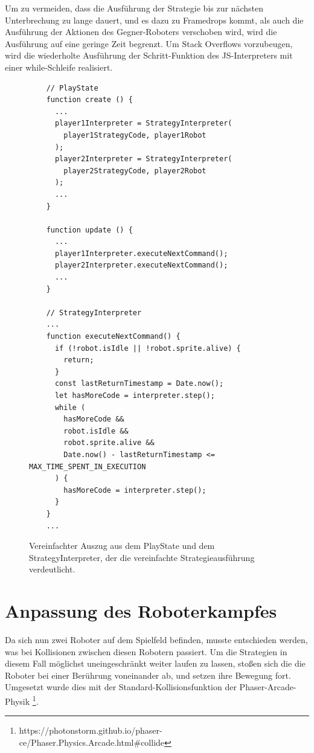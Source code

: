 Um zu vermeiden, dass die Ausführung der Strategie bis zur nächsten Unterbrechung zu lange dauert,
und es dazu zu Framedrops kommt, als auch die Ausführung der Aktionen des Gegner-Roboters verschoben
wird, wird die Ausführung auf eine geringe Zeit begrenzt. Um Stack Overflows vorzubeugen, wird die
wiederholte Ausführung der Schritt-Funktion des JS-Interpreters mit einer while-Schleife realisiert.


\begin{figure}
  \caption{Vereinfachter Auszug aus dem PlayState und dem StrategyInterpreter, der die vereinfachte
  Strategieausführung verdeutlicht.}

  \label{strategy-interpreter-new}

  \begin{lstlisting}
    // PlayState
    function create () {
      ...
      player1Interpreter = StrategyInterpreter(
        player1StrategyCode, player1Robot
      );
      player2Interpreter = StrategyInterpreter(
        player2StrategyCode, player2Robot
      );
      ...
    }

    function update () {
      ...
      player1Interpreter.executeNextCommand();
      player2Interpreter.executeNextCommand();
      ...
    }

    // StrategyInterpreter
    ...
    function executeNextCommand() {
      if (!robot.isIdle || !robot.sprite.alive) {
        return;
      }
      const lastReturnTimestamp = Date.now();
      let hasMoreCode = interpreter.step();
      while (
        hasMoreCode &&
        robot.isIdle &&
        robot.sprite.alive &&
        Date.now() - lastReturnTimestamp <= MAX_TIME_SPENT_IN_EXECUTION
      ) {
        hasMoreCode = interpreter.step();
      }
    }
    ...
  \end{lstlisting}
\end{figure}


\section{Anpassung des Roboterkampfes}

Da sich nun zwei Roboter auf dem Spielfeld befinden, musste entschieden werden, was bei Kollisionen
zwischen diesen Robotern passiert. Um die Strategien in diesem Fall möglichst uneingeschränkt weiter
laufen zu lassen, stoßen sich die die Roboter bei einer Berührung voneinander ab, und setzen ihre
Bewegung fort. Umgesetzt wurde dies mit der Standard-Kollisionsfunktion der Phaser-Arcade-Physik
\footnote{https://photonstorm.github.io/phaser-ce/Phaser.Physics.Arcade.html\#collide}.

